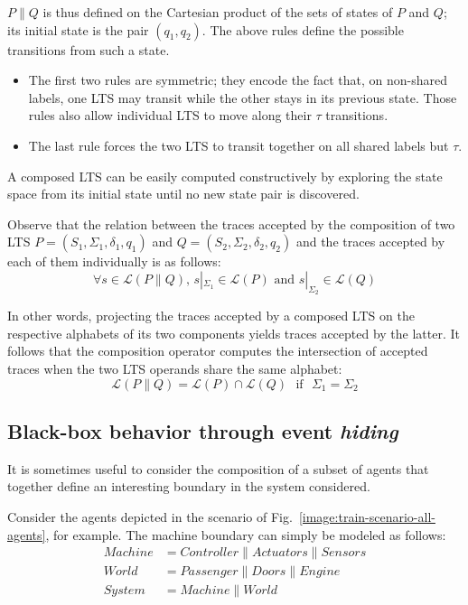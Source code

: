 $P \parallel Q$ is thus defined on the Cartesian product of the sets of states of $P$ and $Q$; its initial state is the pair $(q_1,q_2)$. The above rules define the possible transitions from such a state. 

\begin{itemize}
\item The first two rules are symmetric; they encode the fact that, on non-shared labels, one LTS may transit while the other stays in its previous state. Those rules also allow individual LTS to move along their $\tau$ transitions. 
\item The last rule forces the two LTS to transit together on all shared labels but $\tau$.
\end{itemize}

A composed LTS can be easily computed constructively by exploring the state space from its initial state until no new state pair is discovered. 

Observe that the relation between the traces accepted by the composition of two LTS $P = (S_1,\Sigma_1,\delta_1,q_{1})$ and $Q = (S_2,\Sigma_2,\delta_2,q_{2})$ and the traces accepted by each of them individually is as follows:
\begin{equation*}
\forall s \in \mathcal{L}(P \parallel Q)\mbox{,~} s|_{\Sigma_1} \in \mathcal{L}(P) \mbox{~and~} s|_{\Sigma_2} \in \mathcal{L}(Q)
\end{equation*}

In other words, projecting the traces accepted by a composed LTS on the respective alphabets of its two components yields traces accepted by the latter. It follows that the composition operator computes the intersection of accepted traces when the two LTS operands share the same alphabet:
\begin{equation*}
\mathcal{L}(P \parallel Q) = \mathcal{L}(P) \cap \mathcal{L}(Q) \mbox{~~if~~} \Sigma_{1}=\Sigma_{2}
\end{equation*}

\subsection{Black-box behavior through event \emph{hiding}\label{subsection:lts-hiding}}

It is sometimes useful to consider the composition of a subset of agents that together define an interesting boundary in the system considered. 

Consider the agents depicted in the scenario of Fig.~\ref{image:train-scenario-all-agents}, for example. The machine boundary can simply be modeled as follows:
\begin{align*}
Machine &= Controller \parallel Actuators \parallel Sensors \\
World   &= Passenger \parallel Doors \parallel Engine \\
System  &= Machine \parallel World
\end{align*}

